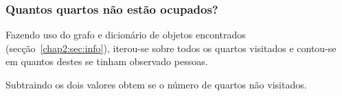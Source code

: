\subsubsection{Quantos quartos não estão ocupados?}
\label{chap2:subsec:q1}

Fazendo uso do grafo e dicionário de objetos encontrados (secção~\ref{chap2:sec:info}), iterou-se sobre todos os quartos visitados e contou-se em quantos destes se tinham observado pessoas.

Subtraindo os dois valores obtem se o número de quartos não visitados.
